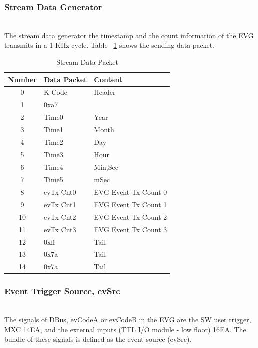\documentclass[journal]{IEEEtran}
\begin{document}
\subsubsection{Stream Data Generator}\hspace*{\fill} \\
The stream data generator the timestamp and the count information of the EVG transmits in a 1 KHz cycle.
Table ~\ref{stream_data_packet} shows the sending data packet.

\begin{table}[h!t]
	\centering
	\caption{Stream Data Packet}
	\label{stream_data_packet}
	
	\begin{tabular}{@{}cll@{}}
		
		\hline
		\textbf{Number}	& \textbf{Data Packet}			& \textbf{Content}\\
		\hline
		0				& K-Code						& Header\\
		1				& 0xa7			                &\\
		\hline
		2				& Time0							& Year\\
		3				& Time1                         & Month\\
		4				& Time2                         & Day\\
		5				& Time3                         & Hour\\
		6				& Time4                         & Min,Sec\\
		7				& Time5                         & mSec\\								
		\hline
		8				& evTx Cnt0						& EVG Event Tx Count 0\\        
		9				& evTx Cnt1						& EVG Event Tx Count 1\\        
		10				& evTx Cnt2						& EVG Event Tx Count 2\\        
		11				& evTx Cnt3						& EVG Event Tx Count 3\\        
		12				& 0xff							& Tail\\        
		13				& 0x7a							& Tail\\        								
		14				& 0x7a							& Tail\\        								
		\hline
	\end{tabular}
\end{table}

\subsubsection{Event Trigger Source, evSrc}\hspace*{\fill} \\
The signals of DBus, evCodeA or evCodeB in the EVG are the SW user trigger, MXC 14EA, and the external inputs (TTL I/O module - low floor) 16EA. The bundle of these signals is defined as the event source (evSrc).
\end{document}
